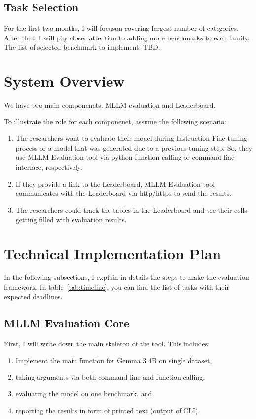 \documentclass[
	letterpaper, %
]{jdf}
\begin{document}
\subsection{Task Selection}\label{ssect:selected-tasks}
For the first two months, I will focuson covering largest number of categories.
After that, I will pay closer attention to adding more benchmarks to each family.
The list of selected benchmark to implement: TBD.

\section{System Overview}\label{sect:sys-overview}
We have two main componenets: MLLM evaluation and Leaderboard.

To illustrate the role for each componenet, assume the following scenario:
\begin{enumerate}
         \item The researchers want to evaluate their model during Instruction Fine-tuning process or a model that was generated due to a previous tuning step.
             So, they use MLLM Evaluation tool via python function calling or command line interface, respectively.
         \item If they provide a link to the Leaderboard, MLLM Evaluation tool communicates with the Leaderboard via http/https to send the results.
         \item The researchers could track the tables in the Leaderboard and see their cells getting filled with evaluation results.
              \end{enumerate}

\section{Technical Implementation Plan}
In the following subsections, I explain in details the steps to make the evaluation framework.
In table~\ref{tab:timeline}, you can find the list of tasks with their expected deadlines.

\subsection{MLLM Evaluation Core}
First, I will write down the main skeleton of the tool.
This includes: 
\begin{enumerate}
         \item Implement the main function for Gemma 3 4B on single dataset,
         \item taking arguments via both command line and function calling,
         \item evaluating the model on one benchmark, and
         \item reporting the results in form of printed text (output of CLI).
              \end{enumerate}
\end{document}
